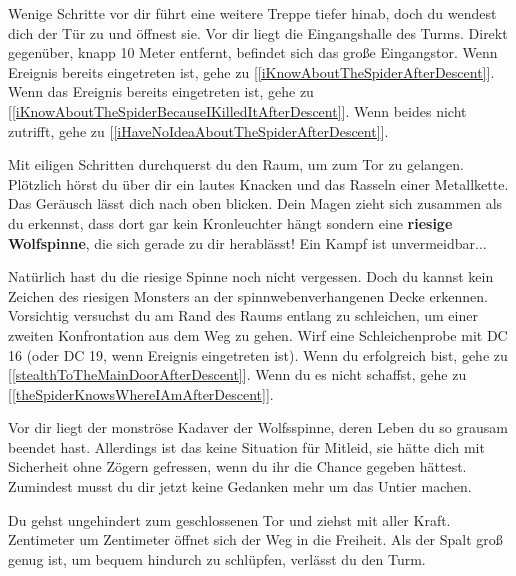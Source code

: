 Wenige Schritte vor dir führt eine weitere Treppe tiefer hinab, doch du wendest dich der Tür zu und öffnest sie. Vor dir liegt die Eingangshalle des Turms. Direkt gegenüber, knapp 10 Meter entfernt, befindet sich das große Eingangstor. Wenn Ereignis  bereits eingetreten ist, gehe zu [\ref{iKnowAboutTheSpiderAfterDescent}]. Wenn das Ereignis  bereits eingetreten ist, gehe zu [\ref{iKnowAboutTheSpiderBecauseIKilledItAfterDescent}].
Wenn beides nicht zutrifft, gehe zu [\ref{iHaveNoIdeaAboutTheSpiderAfterDescent}].


Mit eiligen Schritten durchquerst du den Raum, um zum Tor zu gelangen. Plötzlich hörst du über dir ein lautes Knacken und das Rasseln einer Metallkette.
Das Geräusch lässt dich nach oben blicken. Dein Magen zieht sich zusammen als du erkennst, dass dort gar kein Kronleuchter hängt sondern eine \textbf{riesige Wolfspinne}, die sich gerade zu dir herablässt! Ein Kampf ist unvermeidbar...



Natürlich hast du die riesige Spinne noch nicht vergessen. Doch du kannst kein Zeichen des riesigen Monsters an der spinnwebenverhangenen Decke erkennen. Vorsichtig versuchst du am Rand des Raums entlang zu schleichen, um einer zweiten Konfrontation aus dem Weg zu gehen. Wirf eine Schleichenprobe mit DC 16 (oder DC 19, wenn Ereignis  eingetreten ist). Wenn du erfolgreich bist, gehe zu [\ref{stealthToTheMainDoorAfterDescent}].
Wenn du es nicht schaffst, gehe zu [\ref{theSpiderKnowsWhereIAmAfterDescent}].


Vor dir liegt der monströse Kadaver der Wolfsspinne, deren Leben du so grausam beendet hast. Allerdings ist das keine Situation für Mitleid, sie hätte dich mit Sicherheit ohne Zögern gefressen, wenn du ihr die Chance gegeben hättest. Zumindest musst du dir jetzt keine Gedanken mehr um das Untier machen.

Du gehst ungehindert zum geschlossenen Tor und ziehst mit aller Kraft. Zentimeter um Zentimeter öffnet sich der Weg in die Freiheit. Als der Spalt groß genug ist, um bequem hindurch zu schlüpfen, verlässt du den Turm.

